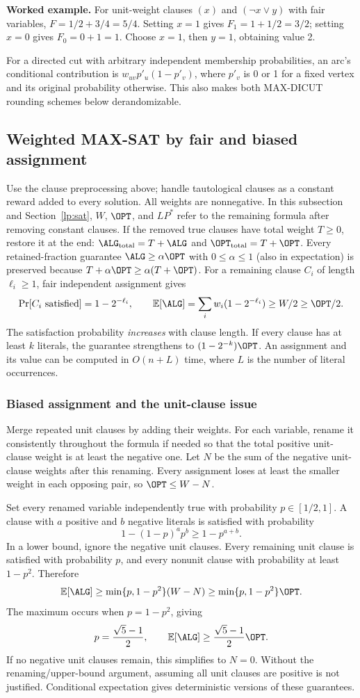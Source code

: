 \textbf{Worked example.}
For unit-weight clauses $(x)$ and $(\neg x\lor y)$ with fair variables,
$F=1/2+3/4=5/4$. Setting $x=1$ gives $F_1=1+1/2=3/2$; setting $x=0$
gives $F_0=0+1=1$. Choose $x=1$, then $y=1$, obtaining value 2.

For a directed cut with arbitrary independent membership probabilities,
an arc's conditional contribution is $w_{uv}p'_u(1-p'_v)$, where $p'_v$ is
0 or 1 for a fixed vertex and its original probability otherwise.
This also makes both MAX-DICUT rounding schemes below derandomizable.

\subsection{Weighted MAX-SAT by fair and biased assignment}\label{ra:sat}
Use the clause preprocessing above; handle tautological clauses as a constant
reward added to every solution. All weights are nonnegative. In this
subsection and Section~\ref{lp:sat}, $W$, $\OPT$, and $LP^*$ refer to the
remaining formula after removing constant clauses. If the removed true
clauses have total weight $T\ge0$, restore it at the end:
$\ALG_{\rm total}=T+\ALG$ and $\OPT_{\rm total}=T+\OPT$.
Every retained-fraction guarantee $\ALG\ge\alpha\OPT$ with $0\le\alpha\le1$
(also in expectation) is preserved because
$T+\alpha\OPT\ge\alpha(T+\OPT)$.
For a remaining
clause $C_i$ of length $\ell_i\ge1$, fair independent assignment gives
\[
  \Pr[C_i\text{ satisfied}]=1-2^{-\ell_i},\qquad
  \mathbb E[\ALG]=\sum_iw_i(1-2^{-\ell_i})\ge W/2\ge\OPT/2.
\]
The satisfaction probability \emph{increases} with clause length. If every
clause has at least $k$ literals, the guarantee strengthens to
$(1-2^{-k})\OPT$. An assignment and its value can be computed in $O(n+L)$
time, where $L$ is the number of literal occurrences.

\subsubsection*{Biased assignment and the unit-clause issue}
Merge repeated unit clauses by adding their weights. For each variable,
rename it consistently throughout the formula if needed so that the total
positive unit-clause weight is at least the negative one. Let $N$ be the sum
of the negative unit-clause weights after this renaming. Every assignment
loses at least the smaller weight in each opposing pair, so
$\OPT\le W-N$.

Set every renamed variable independently true with probability
$p\in[1/2,1]$. A clause with $a$ positive and $b$ negative literals is
satisfied with probability
\[
  1-(1-p)^a p^b\ge1-p^{a+b}.
\]
In a lower bound, ignore the negative unit clauses. Every remaining unit
clause is satisfied with probability $p$, and every nonunit clause with
probability at least $1-p^2$. Therefore
\[
  \mathbb E[\ALG]\ge\min\{p,1-p^2\}(W-N)
    \ge\min\{p,1-p^2\}\OPT.
\]
The maximum occurs when $p=1-p^2$, giving
\[
  p=\frac{\sqrt5-1}{2},\qquad
  \mathbb E[\ALG]\ge\frac{\sqrt5-1}{2}\OPT.
\]
If no negative unit clauses remain, this simplifies to $N=0$.
Without the renaming/upper-bound argument, assuming all unit clauses are
positive is not justified. Conditional expectation gives deterministic
versions of these guarantees.


